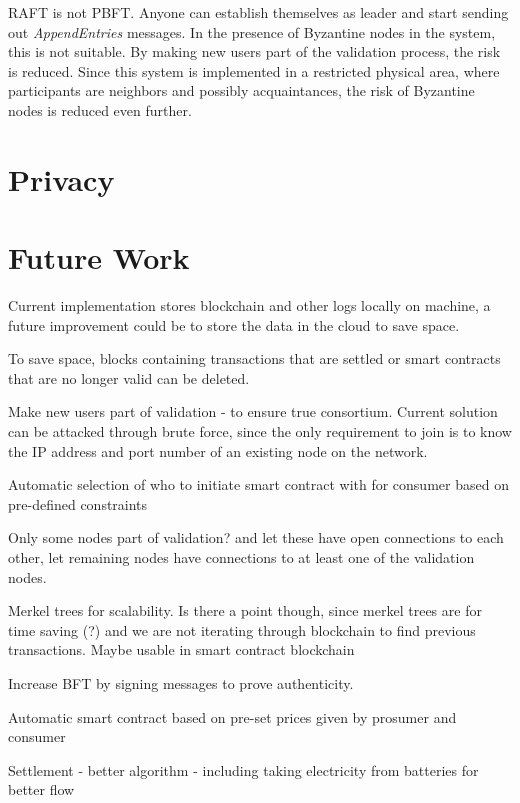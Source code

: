
RAFT is not PBFT. Anyone can establish themselves as leader and start sending out \textit{AppendEntries} messages. In the presence of Byzantine nodes in the system, this is not suitable. By making new users part of the validation process, the risk is reduced. Since this system is implemented in a restricted physical area, where participants are neighbors and possibly acquaintances, the risk of Byzantine nodes is reduced even further.

\section{Privacy}



\section{Future Work}
Current implementation stores blockchain and other logs locally on machine, a future improvement could be to store the data in the cloud to save space.

To save space, blocks containing transactions that are settled or smart contracts that are no longer valid can be deleted. 

Make new users part of validation - to ensure true consortium. Current solution can be attacked through brute force, since the only requirement to join is to know the IP address and port number of an existing node on the network.

Automatic selection of who to initiate smart contract with for consumer based on pre-defined constraints 

Only some nodes part of validation? and let these have open connections to each other, let remaining nodes have connections to at least one of the validation nodes. 

Merkel trees for scalability. Is there a point though, since merkel trees are for time saving (?) and we are not iterating through blockchain to find previous transactions. Maybe usable in smart contract blockchain

Increase BFT by signing messages to prove authenticity. 

Automatic smart contract based on pre-set prices given by prosumer and consumer

Settlement - better algorithm - including taking electricity from batteries for better flow